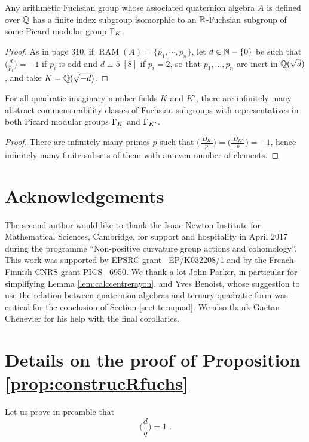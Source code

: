 \documentclass[11pt]{article}
\begin{document}
\bcoro 
Any arithmetic Fuchsian group whose associated quaternion algebra $A$ is
defined over ${\mathbb Q}$ has a finite index subgroup isomorphic to an
${\mathbb R}$-Fuchsian subgroup of some Picard modular group $\Gamma_K$.  
\ecoro

\begin{proof} As in \cite{Maclachlan86} page 310, if $\operatorname{RAM}(A)=
\{p_1,\cdots,p_n\}$, let $d\in{\mathbb N}-\{0\}$ be such that
$\big(\frac{d}{p_i} \big) =-1$ if $p_i$ is odd and $d\equiv 5\;[8]$ if
$p_i=2$, so that $p_1,\dots,p_n$ are inert in ${\mathbb Q}(\sqrt{d})$, and take 
$K={\mathbb Q}(\sqrt{-d})$.
\end{proof}

\bcoro For all quadratic imaginary number fields $K$ and $K'$, there
are infinitely many abstract commensurability classes of Fuchsian
subgroups with representatives in both Picard modular groups $\Gamma_K$
and $\Gamma_{K'}$.  
\ecoro

\begin{proof} There are infinitely many %
primes $p$ such that
$\big(\frac{|D_K|}{p} \big) = \big(\frac{|D_{K'}|}{p} \big) = -1$, hence
infinitely many finite subsets of them with an even number of elements.
\end{proof}

\section*{Acknowledgements}
The second author
  would like to thank the Isaac Newton Institute for Mathematical
  Sciences, Cambridge, for support and hospitality in April 2017
  during the programme ``Non-positive curvature group actions and
  cohomology''. This work was supported by EPSRC grant
  \textnumero\ EP/K032208/1 and by the French-Finnish CNRS grant PICS
  \textnumero\ 6950. We thank a lot John Parker, in particular for
  simplifying Lemma \ref{lem:calccentrerayon}, and Yves Benoist, whose
  suggestion to use the relation between quaternion algebras and
  ternary quadratic form was critical for the conclusion of Section
  \ref{sect:ternquad}. We also thank Gaëtan Chenevier for his help
  with the final corollaries.

\appendix
\section{Details on the proof of Proposition \ref{prop:construcRfuchs}}

Let us prove in preamble that
\begin{equation}\label{eq:doverq}
\big(\frac{d}{q}\big)=1\;.
\end{equation}
\end{document}
